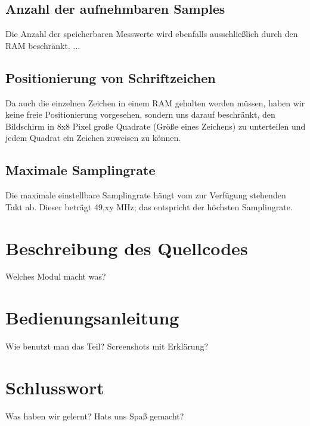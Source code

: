 \documentclass[IN,ngerman,utf8,12pt]{tumbook}
\begin{document}
\section{Anzahl der aufnehmbaren Samples}
Die Anzahl der speicherbaren Messwerte wird ebenfalls ausschließlich durch den RAM beschränkt. ...

\section{Positionierung von Schriftzeichen}
Da auch die einzelnen Zeichen in einem RAM gehalten werden müssen, haben wir keine freie Positionierung vorgesehen, sondern uns darauf beschränkt, den Bildschirm in 8x8 Pixel große Quadrate (Größe eines Zeichens) zu unterteilen und jedem Quadrat ein Zeichen zuweisen zu können.

\section{Maximale Samplingrate}
Die maximale einstellbare Samplingrate hängt vom zur Verfügung stehenden Takt ab. Dieser beträgt 49,xy MHz; das entspricht der höchsten Samplingrate.

\chapter{Beschreibung des Quellcodes}
Welches Modul macht was?

\chapter{Bedienungsanleitung}
Wie benutzt man das Teil? Screenshots mit Erklärung?

\chapter{Schlusswort}
Was haben wir gelernt? Hats uns Spaß gemacht?


\end{document}
